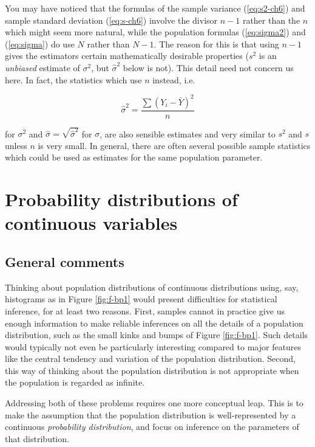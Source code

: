 \documentclass[11pt,a4paper,openany]{book}
\begin{document}
You may have noticed that the formulas of the sample variance
(\ref{eq:s2-ch6}) and sample standard deviation (\ref{eq:s-ch6}) involve
the divisor \(n-1\) rather than the \(n\) which might seem more natural,
while the population formulas (\ref{eq:sigma2}) and (\ref{eq:sigma}) do
use \(N\) rather than \(N-1\). The reason for this is that using \(n-1\)
gives the estimators certain mathematically desirable properties
(\(s^{2}\) is an \emph{unbiased} estimate of \(\sigma^{2}\), but
\(\hat{\sigma}^{2}\) below is not). This detail need not concern us
here. In fact, the statistics which use \(n\) instead, i.e.

\begin{equation}\hat{\sigma}^{2}=\frac{\sum (Y_{i}-\bar{Y})^{2}}{n}
\label{eq:s2b}\end{equation}

for \(\sigma^{2}\) and \(\hat{\sigma}=\sqrt{\hat{\sigma}^{2}}\) for
\(\sigma\), are also sensible estimates and very similar to \(s^{2}\)
and \(s\) unless \(n\) is very small. In general, there are often
several possible sample statistics which could be used as estimates for
the same population parameter.

\section{Probability distributions of continuous
variables}\label{s-contd-probdistrs}

\subsection{General comments}\label{ss-contd-probdistrs-general}

Thinking about population distributions of continuous distributions
using, say, histograms as in Figure \ref{fig:f-bp1} would present
difficulties for statistical inference, for at least two reasons. First,
samples cannot in practice give us enough information to make reliable
inferences on all the details of a population distribution, such as the
small kinks and bumps of Figure \ref{fig:f-bp1}. Such details would
typically not even be particularly interesting compared to major
features like the central tendency and variation of the population
distribution. Second, this way of thinking about the population
distribution is not appropriate when the population is regarded as
infinite.

Addressing both of these problems requires one more conceptual leap.
This is to make the assumption that the population distribution is
well-represented by a continuous \emph{probability distribution}, and
focus on inference on the parameters of that distribution.
\end{document}
